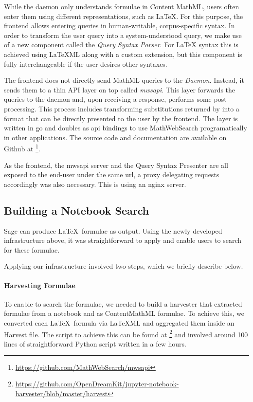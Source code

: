 While the \MWS daemon only understands formulae in Content MathML, users often enter them using different representations, such as \LaTeX. 
For this purpose, the frontend allows entering queries in human-writable, corpus-specific syntax. 
In order to transform the user query into a system-understood query, we make use of a new component called the \textit{Query Syntax Parser}. 
For {\LaTeX} syntax this is achieved using {\LaTeX}ML along with a custom \MWS extension, but this component is fully interchangeable if the user desires other syntaxes. 

The frontend does not directly send MathML queries to the \textit{Daemon}.
Instead, it sends them to a thin API layer on top called \textit{mwsapi}. 
This layer forwards the queries to the daemon and, upon receiving a response, performs some post-processing. 
This process includes transforming substitutions returned by \MWS into a format that can be directly presented to the user by the frontend. 
The layer is written in go and doubles as api bindings to use MathWebSearch programatically in other applications. 
The source code and documentation are available on Github at \footnote{\url{https://github.com/MathWebSearch/mwsapi}}. 

As the frontend, the mwsapi server and the Query Syntax Presenter are all exposed to the end-user under the same url, a proxy delegating requests accordingly was also necessary. 
This is using an nginx server. 

\subsection{Building a Notebook Search}

Sage can produce \LaTeX\ formulae as output.
Using the newly developed infrastructure above, it was straightforward to apply \MWS and enable users to search for these formulae. 

Applying our infrastructure involved two steps, which we briefly describe below.

\paragraph{Harvesting Formulae}
To enable \MWS to search the formulae, we needed to build a harvester that extracted formulae from a notebook and as ContentMathML formulae. 
To achieve this, we converted each \LaTeX\ formula via LaTeXML and aggregated them inside an \MWS Harvest file. 
The script to achieve this can be found at \footnote{\url{https://github.com/OpenDreamKit/jupyter-notebook-harvester/blob/master/harvest}} and involved around 100 lines of straightforward Python script written in a few hours. 

